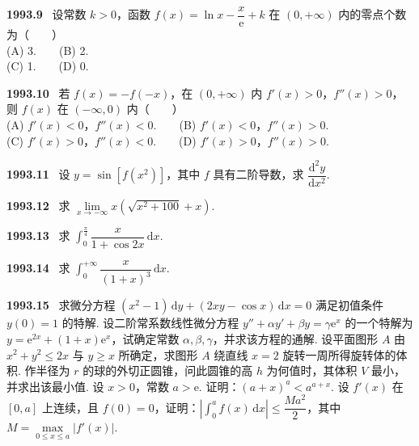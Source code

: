 \documentclass[UTF8,12pt]{ctexart}
\newcommand{\qn}[1]{\textbf{\large #1}\ }
\begin{document}
\vfill
\newpage
\qn{1993.9}
设常数 $k>0$，函数 $f(x)=\ln x-\dfrac{x}{\mathrm{e}}+k$ 在 $(0,+\infty)$ 内的零点个数为（　　）
\\
\noindent (A) 3.　　(B) 2.
\\
\noindent (C) 1.　　(D) 0.

\vfill
\newpage
\qn{1993.10}
若 $f(x)=-f(-x)$，在 $(0,+\infty)$ 内 $f'(x)>0$，$f''(x)>0$，则 $f(x)$ 在 $(-\infty,0)$ 内（　　）
\\
\noindent (A) $f'(x)<0$，$f''(x)<0$.　　(B) $f'(x)<0$，$f''(x)>0$.
\\
\noindent (C) $f'(x)>0$，$f''(x)<0$.　　(D) $f'(x)>0$，$f''(x)>0$.

\vfill
\newpage
\qn{1993.11}
设 $y=\sin[f(x^2)]$，其中 $f$ 具有二阶导数，求 $\dfrac{\mathrm{d}^2y}{\mathrm{d}x^2}$.

\vfill
\newpage
\qn{1993.12}
求 $\lim\limits_{x\to-\infty}x(\sqrt{x^2+100}+x)$.

\vfill
\newpage
\qn{1993.13}
求 $\int_0^{\frac{\pi}{4}}\dfrac{x}{1+\cos 2x}\,\mathrm{d}x$.

\vfill
\newpage
\qn{1993.14}
求 $\int_0^{+\infty}\dfrac{x}{(1+x)^3}\,\mathrm{d}x$.

\vfill
\newpage
\qn{1993.15}
求微分方程 $(x^2-1)\,\mathrm{d}y+(2xy-\cos x)\,\mathrm{d}x=0$ 满足初值条件 $y(0)=1$ 的特解.
设二阶常系数线性微分方程 $y''+\alpha y'+\beta y=\gamma\mathrm{e}^x$ 的一个特解为 $y=\mathrm{e}^{2x}+(1+x)\mathrm{e}^x$，试确定常数 $\alpha,\beta,\gamma$，并求该方程的通解.
设平面图形 $A$ 由 $x^2+y^2\leqslant 2x$ 与 $y\geqslant x$ 所确定，求图形 $A$ 绕直线 $x=2$ 旋转一周所得旋转体的体积.
作半径为 $r$ 的球的外切正圆锥，问此圆锥的高 $h$ 为何值时，其体积 $V$ 最小，并求出该最小值.
设 $x>0$，常数 $a>\mathrm{e}$. 证明：$(a+x)^a<a^{a+x}$.
设 $f'(x)$ 在 $[0,a]$ 上连续，且 $f(0)=0$，证明：$\left|\int_0^a f(x)\,\mathrm{d}x\right|\leqslant\dfrac{Ma^2}{2}$，其中 $M=\max\limits_{0\leqslant x\leqslant a}|f'(x)|$.

\vfill
\newpage
\end{document}
